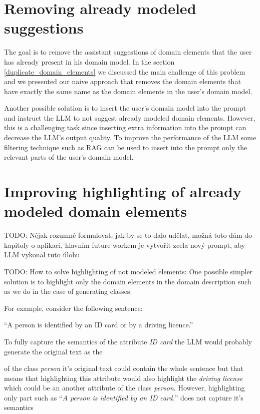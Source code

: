 \section{Removing already modeled suggestions}

The goal is to remove the assistant suggestions of domain elements that the user has already present in his domain model. In the section \ref{duplicate_domain_elements} we discussed the main challenge of this problem and we presented our naive approach that removes the domain elements that have exactly the same name as the domain elements in the user's domain model.

Another possible solution is to insert the user's domain model into the prompt and instruct the LLM to not suggest already modeled domain elements. However, this is a challenging task since inserting extra information into the prompt can decrease the LLM's output quality. To improve the performance of the LLM some filtering technique such as RAG can be used to insert into the prompt only the relevant parts of the user's domain model.


\section{Improving highlighting of already modeled domain elements}

TODO: Nějak rozumně formulovat, jak by se to dalo udělat, možná toto dám do kapitoly o aplikaci, hlavním future workem je vytvořit zcela nový prompt, aby LLM vykonal tuto úlohu

TODO: How to solve highlighting of not modeled elements: One possible simpler solution is to highlight only the domain elements in the domain description such as we do in the case of generating classes.

For example, consider the following sentence:

\noindent{} ``A person is identified by an ID card or by a driving licence.''

To fully capture the semantics of the attribute \textit{ID card} the LLM would probably generate the original text as the 

of the class \textit{person} it's original text could contain the whole sentence but that means that highlighting this attribute would also highlight the \textit{driving license} which could be an another attribute of the class \textit{person}. However, highlighting only part such as ``\textit{A person is identified by an ID card.}'' does not capture it's semantics \\

